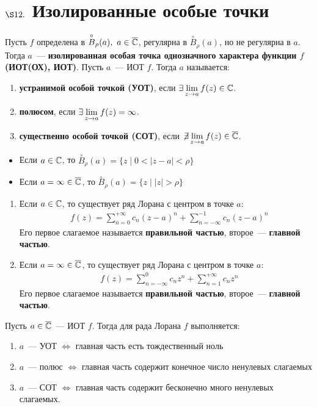 \section{$\S 12.$ Изолированные особые точки}
\Def
Пусть $f$ определена в $\overset{\circ}{B}_\rho(a), \ a \in \overline{\mathbb{C}}$, регулярна в
$\overset{\circ}{B}_\rho(a)$, но не регулярна в $a$. Тогда $a$~---
\textbf{изолированная особая точка однозначного характера функции $f$ (ИОТ(ОХ),
  ИОТ)}.
\Def
Пусть $a$~--- ИОТ $f$. Тогда $a$ называется:
\begin{enumerate}
    \item \textbf{устранимой особой точкой (УОТ)}, если $\exists \displaystyle \lim_{z
      \to a} f(z) \in \mathbb{C}$.
    \item \textbf{полюсом}, если $\exists \displaystyle \lim_{z \to a}f(z) = \infty$.
    \item \textbf{существенно особой точкой (СОТ)}, если $\not \! \exists \displaystyle
    \lim_{z \to a} f(z) \in \overline{\mathbb{C}}$.
\end{enumerate}
\begin{itemize}
    \item Если $a \in \mathbb{C}$, то $\overset{\circ}{B}_\rho(a) = \{z \mid 0 < \left|
        z-a \right| < \rho\}$
    \item Если $a = \infty \in \overline{\mathbb{C}}$, то $\overset{\circ}{B}_\rho(a) = \{z \mid
    \left| z \right| > \rho\}$
\end{itemize}
\begin{enumerate}
    \item Если $a \in \mathbb{C}$, то существует ряд Лорана с центром в точке $a$:
    \begin{align*}
      & f(z) = \sum_{n=0}^{+\infty}c_n(z-a)^n + \sum_{n=-\infty}^{-1} c_n(z-a)^n
    \end{align*}
    Его первое слагаемое называется \textbf{правильной частью}, второе~---
    \textbf{главной частью}.
    \item Если $a  = \infty \in \overline{\mathbb{C}}$, то существует ряд Лорана с центром в
    точке $a$:
    \begin{align*}
      & f(z) = \sum_{n=-\infty}^{0}c_nz^n + \sum_{n=1}^{+\infty} c_nz^n
    \end{align*}
    Его первое слагаемое называется \textbf{правильной частью}, второе~---
    \textbf{главной частью}.
\end{enumerate}
\theorem
Пусть $a \in \overline{\mathbb{C}}$~--- ИОТ $f$. Тогда для рада Лорана $f$ выполняется:
\begin{enumerate}
    \item $a$~--- УОТ $\Leftrightarrow$ главная часть есть тождественный ноль
    \item $a$~--- полюс $\Leftrightarrow$ главная часть содержит конечное число
    ненулевых слагаемых
    \item $a$~--- СОТ $\Leftrightarrow$ главная часть содержит бесконечно много
    ненулевых слагаемых.
\end{enumerate}

